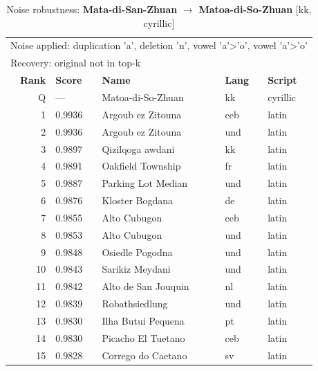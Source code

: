 \begin{table}[htbp]
\centering
\small
\caption{Noise robustness: \textbf{Mata-di-San-Zhuan} $\rightarrow$ \textbf{Matoa-di-So-Zhuan} [kk, cyrillic]}
\label{tab:noise-12}
\begin{tabular}{rllll}
\toprule
\multicolumn{5}{l}{\small Noise applied: duplication 'a', deletion 'n', vowel 'a'>'o', vowel 'a'>'o'} \\
\multicolumn{5}{l}{\small Recovery: original not in top-k} \\
\midrule
\textbf{Rank} & \textbf{Score} & \textbf{Name} & \textbf{Lang} & \textbf{Script} \\
\midrule
\rowcolor{gray!20} Q & --- & Matoa-di-So-Zhuan & kk & cyrillic \\
\midrule
1 & 0.9936 & Argoub ez Zitouna & ceb & latin \\
2 & 0.9936 & Argoub ez Zitouna & und & latin \\
3 & 0.9897 & Qizilqoga awdani & kk & latin \\
4 & 0.9891 & Oakfield Township & fr & latin \\
5 & 0.9887 & Parking Lot Median & und & latin \\
6 & 0.9876 & Kloster Bogdana & de & latin \\
7 & 0.9855 & Alto Cubugon & ceb & latin \\
8 & 0.9853 & Alto Cubugon & und & latin \\
9 & 0.9848 & Osiedle Pogodna & und & latin \\
10 & 0.9843 & Sarikiz Meydani & und & latin \\
11 & 0.9842 & Alto de San Jouquin & nl & latin \\
12 & 0.9839 & Robathsiedlung & und & latin \\
13 & 0.9830 & Ilha Butui Pequena & pt & latin \\
14 & 0.9830 & Picacho El Tuetano & ceb & latin \\
15 & 0.9828 & Corrego do Caetano & sv & latin \\
\bottomrule
\end{tabular}
\end{table}

